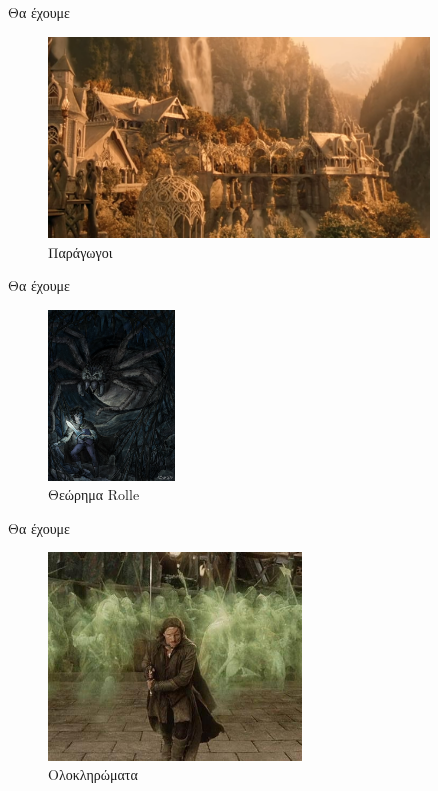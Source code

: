 \documentclass{presentation}
\begin{document}
\begin{frame}{Θα έχουμε}
      \begin{figure}
            \centering
            \includegraphics[width=0.9\textwidth]{"images/riverdale"}
            \caption{Παράγωγοι}
      \end{figure}
\end{frame}

\begin{frame}{Θα έχουμε}
      \begin{figure}
            \centering
            \includegraphics[width=0.3\textwidth]{"images/shelob"}
            \caption{Θεώρημα Rolle}
      \end{figure}
\end{frame}

\begin{frame}{Θα έχουμε}
      \begin{figure}
            \centering
            \includegraphics[width=0.6\textwidth]{"images/armyofdead"}
            \caption{Ολοκληρώματα}
      \end{figure}
\end{frame}
\end{document}
